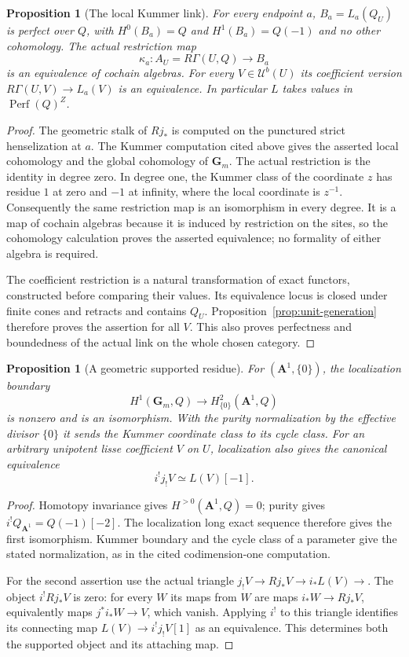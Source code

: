 \documentclass[11pt]{article}
\newtheorem{proposition}[theorem]{Proposition}
\theoremstyle{definition}
\theoremstyle{remark}
\newcommand{\Perf}{\operatorname{Perf}}
\begin{document}
\begin{proposition}[The local Kummer link]\label{prop:link}
For every endpoint $a$, $B_a=L_a(Q_U)$ is perfect over $Q$, with
$H^0(B_a)=Q$ and $H^1(B_a)=Q(-1)$ and no other cohomology.  The actual
restriction map
\[
 \kappa_a:A_U=R\Gamma(U,Q)\longrightarrow B_a
\]
is an equivalence of cochain algebras.  For every $V\in\mathcal U^b(U)$
its coefficient version $R\Gamma(U,V)\to L_a(V)$ is an equivalence.
In particular $L$ takes values in $\Perf(Q)^Z$.
\end{proposition}
\begin{proof}
The geometric stalk of $Rj_*$ is computed on the punctured strict
henselization at $a$.  The Kummer computation cited above gives the
asserted local cohomology and the global cohomology of $\mathbf G_m$.
The actual restriction is the identity in degree zero.  In degree one,
the Kummer class of the coordinate $z$ has residue $1$ at zero and
$-1$ at infinity, where the local coordinate is $z^{-1}$.  Consequently
the same restriction map is an isomorphism in every degree.  It is a
map of cochain algebras because it is induced by restriction on the
sites, so the cohomology calculation proves the asserted equivalence;
no formality of either algebra is required.

The coefficient restriction is a natural transformation of exact
functors, constructed before comparing their values.  Its equivalence
locus is closed under finite cones and retracts and contains $Q_U$.
Proposition~\ref{prop:unit-generation} therefore proves the assertion
for all $V$.  This also proves perfectness and boundedness of the actual
link on the whole chosen category.
\end{proof}

\begin{proposition}[A geometric supported residue]\label{prop:residue}
For $(\mathbf A^1,\{0\})$, the localization boundary
\[
 H^1(\mathbf G_m,Q)\longrightarrow H^2_{\{0\}}(\mathbf A^1,Q)
\]
is nonzero and is an isomorphism.  With the purity normalization by the
effective divisor $\{0\}$ it sends the Kummer coordinate class to its
cycle class.  For an arbitrary unipotent lisse coefficient $V$ on $U$,
localization also gives the canonical equivalence
\[
 i^!j_!V\simeq L(V)[-1].
\]
\end{proposition}
\begin{proof}
Homotopy invariance gives $H^{>0}(\mathbf A^1,Q)=0$; purity gives
$i^!Q_{\mathbf A^1}=Q(-1)[-2]$.  The localization long exact sequence
therefore gives the first isomorphism.  Kummer boundary and the cycle
class of a parameter give the stated normalization, as in the cited
codimension-one computation.

For the second assertion use the actual triangle
$j_!V\to Rj_*V\to i_*L(V)\to$.  The object $i^!Rj_*V$ is zero:
for every $W$ its maps from $W$ are maps $i_*W\to Rj_*V$, equivalently
maps $j^*i_*W\to V$, which vanish.  Applying $i^!$ to this triangle
identifies its connecting map $L(V)\to i^!j_!V[1]$ as an equivalence.
This determines both the supported object and its attaching map.
\end{proof}
\end{document}
